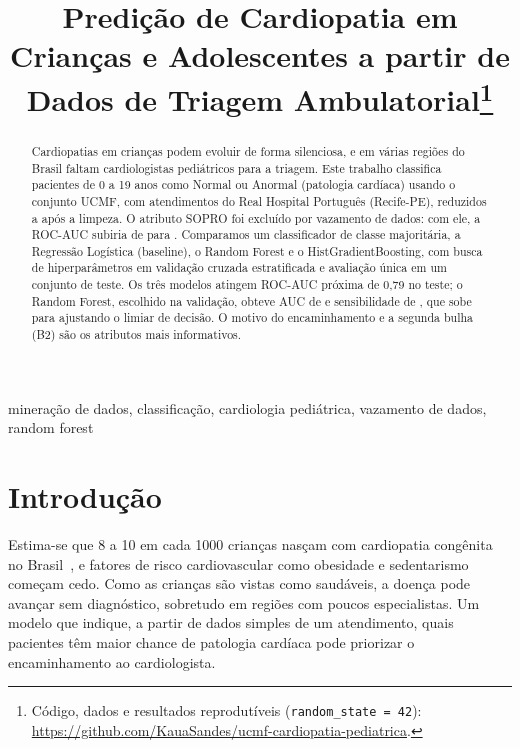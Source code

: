 \documentclass[conference]{IEEEtran}
\begin{document}
\title{Predição de Cardiopatia em Crianças e Adolescentes a partir de Dados de Triagem Ambulatorial\thanks{Código, dados e resultados reprodutíveis (\texttt{random\_state = 42}): \url{https://github.com/KauaSandes/ucmf-cardiopatia-pediatrica}.}}

\author{
}

\maketitle

\begin{abstract}
Cardiopatias em crianças podem evoluir de forma silenciosa, e em várias regiões do Brasil faltam cardiologistas pediátricos para a triagem. Este trabalho classifica pacientes de 0 a 19 anos como Normal ou Anormal (patologia cardíaca) usando o conjunto UCMF, com \Nbruto{} atendimentos do Real Hospital Português (Recife-PE), reduzidos a \Nlimpo{} após a limpeza. O atributo SOPRO foi excluído por vazamento de dados: com ele, a ROC-AUC subiria de \SensFinalAUC{} para \SensSoproAUC{}. Comparamos um classificador de classe majoritária, a Regressão Logística (baseline), o Random Forest e o HistGradientBoosting, com busca de hiperparâmetros em validação cruzada estratificada e avaliação única em um conjunto de teste. Os três modelos atingem ROC-AUC próxima de 0,79 no teste; o Random Forest, escolhido na validação, obteve AUC de \MelhorAUC{} e sensibilidade de \MelhorRec{}, que sobe para \LimRec{} ajustando o limiar de decisão. O motivo do encaminhamento e a segunda bulha (B2) são os atributos mais informativos.
\end{abstract}

\begin{IEEEkeywords}
mineração de dados, classificação, cardiologia pediátrica, vazamento de dados, random forest
\end{IEEEkeywords}

\section{Introdução}
Estima-se que 8 a 10 em cada 1000 crianças nasçam com cardiopatia congênita no Brasil~\cite{pinto2004}, e fatores de risco cardiovascular como obesidade e sedentarismo começam cedo. Como as crianças são vistas como saudáveis, a doença pode avançar sem diagnóstico, sobretudo em regiões com poucos especialistas. Um modelo que indique, a partir de dados simples de um atendimento, quais pacientes têm maior chance de patologia cardíaca pode priorizar o encaminhamento ao cardiologista.
\end{document}
